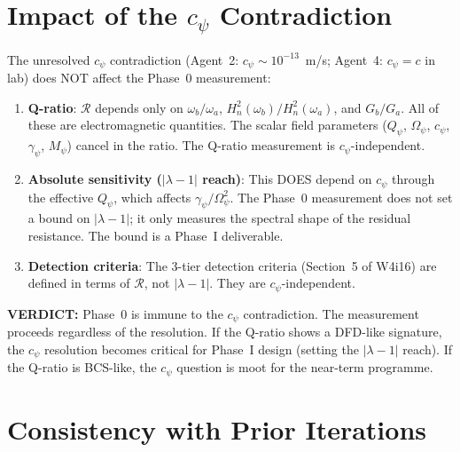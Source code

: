 \documentclass[11pt]{article}
\newcommand{\Heff}{H_n}
\newcommand{\verdict}[1]{\textcolor{green!50!black}{\textbf{VERDICT:} #1}}
\theoremstyle{definition}
\theoremstyle{remark}
\begin{document}
\section{Impact of the $c_\psi$ Contradiction}

The unresolved $c_\psi$ contradiction (Agent~2: $c_\psi \sim 10^{-13}$~m/s;
Agent~4: $c_\psi = c$ in lab) does NOT affect the Phase~0 measurement:

\begin{enumerate}
\item \textbf{Q-ratio}: $\mathcal{R}$ depends only on $\omega_b/\omega_a$,
  $\Heff^2(\omega_b)/\Heff^2(\omega_a)$, and $G_b/G_a$. All of these
  are electromagnetic quantities. The scalar field parameters
  ($Q_\psi$, $\Omega_\psi$, $c_\psi$, $\gamma_\psi$, $M_\psi$)
  cancel in the ratio. The Q-ratio measurement is $c_\psi$-independent.

\item \textbf{Absolute sensitivity ($|\lambda - 1|$ reach)}: This DOES
  depend on $c_\psi$ through the effective $Q_\psi$, which affects
  $\gamma_\psi/\Omega_\psi^2$. The Phase~0 measurement does not set
  a bound on $|\lambda - 1|$; it only measures the spectral shape
  of the residual resistance. The bound is a Phase~I deliverable.

\item \textbf{Detection criteria}: The 3-tier detection criteria
  (Section~5 of W4i16) are defined in terms of $\mathcal{R}$, not
  $|\lambda - 1|$. They are $c_\psi$-independent.
\end{enumerate}

\verdict{Phase~0 is immune to the $c_\psi$ contradiction.
The measurement proceeds regardless of the resolution. If the
Q-ratio shows a DFD-like signature, the $c_\psi$ resolution
becomes critical for Phase~I design (setting the
$|\lambda - 1|$ reach). If the Q-ratio is BCS-like, the
$c_\psi$ question is moot for the near-term programme.}


\section{Consistency with Prior Iterations}
\end{document}
